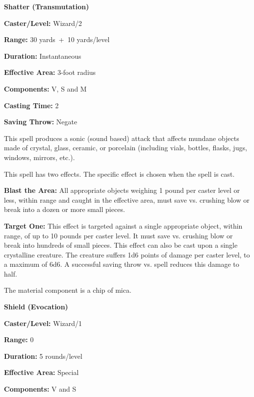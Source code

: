 \begin{multicols}{2}
\begin{minipage}{\columnwidth}
\noindent \textbf{Shatter (Transmutation)}

\noindent \textbf{Caster/Level:} Wizard/2

\noindent \textbf{Range:} 30 yards~+~10 yards/level

\noindent \textbf{Duration:} Instantaneous

\noindent \textbf{Effective Area:} 3-foot radius

\noindent \textbf{Components:} V, S and M

\noindent \textbf{Casting Time:} 2

\noindent \textbf{Saving Throw:} Negate

\end{minipage}

This spell produces a sonic (sound based) attack that affects mundane objects made of crystal, glass, ceramic, or porcelain (including vials, bottles, flasks, jugs, windows, mirrors, etc.).  

This spell has two effects.  The specific effect is chosen when the spell is cast.

\textbf{Blast the Area:} All appropriate objects weighing 1 pound per caster level or less, within range and caught in the effective area, must save vs. crushing blow or break into a dozen or more small pieces.  

\textbf{Target One:} This effect is targeted against a single appropriate object, within range, of up to 10 pounds per caster level.  It must save vs. crushing blow or break into hundreds of small pieces.  This effect can also be cast upon a single crystalline creature.  The creature suffers 1d6 points of damage per caster level, to a maximum of 6d6.  A successful saving throw vs. spell reduces this damage to half.

The material component is a chip of mica.

\vspace{1em}

\noindent
\begin{minipage}{\columnwidth}

\noindent \textbf{Shield (Evocation)}

\noindent \textbf{Caster/Level:} Wizard/1

\noindent \textbf{Range:} 0

\noindent \textbf{Duration:} 5 rounds/level

\noindent \textbf{Effective Area:} Special

\noindent \textbf{Components:} V and S


\end{minipage}
\end{multicols}
